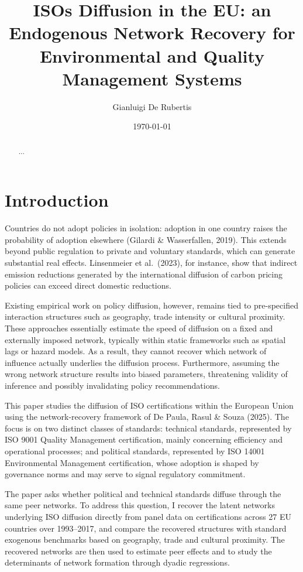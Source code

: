 \documentclass[12pt,a4paper]{article}
\title{ISOs Diffusion in the EU: an Endogenous Network Recovery for
       Environmental and Quality Management Systems}
\author{Gianluigi De Rubertis}
\date{\today}
\begin{document}
\maketitle

\begin{abstract}
    ...
\end{abstract}

\newpage

\tableofcontents

\newpage

\section{Introduction}

Countries do not adopt policies in isolation: adoption in one country raises the probability of adoption elsewhere (Gilardi \& Wasserfallen, 2019). This extends beyond public regulation to private and voluntary standards, which can generate substantial real effects. Linsenmeier et al.\ (2023), for instance, show that indirect emission reductions generated by the international diffusion of carbon pricing policies can exceed direct domestic reductions.

Existing empirical work on policy diffusion, however, remains tied to pre-specified interaction structures such as geography, trade intensity or cultural proximity. These approaches essentially estimate the speed of diffusion on a fixed and externally imposed network, typically within static frameworks such as spatial lags or hazard models. As a result, they cannot recover which network of influence actually underlies the diffusion process. Furthermore, assuming the wrong network structure results into biased parameters, threatening validity of inference and possibly invalidating policy recommendations.

This paper studies the diffusion of ISO certifications within the European Union using the network-recovery framework of De Paula, Rasul \& Souza (2025). The focus is on two distinct classes of standards: technical standards, represented by ISO 9001 Quality Management certification, mainly concerning efficiency and operational processes; and political standards, represented by ISO 14001 Environmental Management certification, whose adoption is shaped by governance norms and may serve to signal regulatory commitment.

The paper asks whether political and technical standards diffuse through the same peer networks. To address this question, I recover the latent networks underlying ISO diffusion directly from panel data on certifications across 27 EU countries over 1993--2017, and compare the recovered structures with standard exogenous benchmarks based on geography, trade and cultural proximity. The recovered networks are then used to estimate peer effects and to study the determinants of network formation through dyadic regressions.
\end{document}
